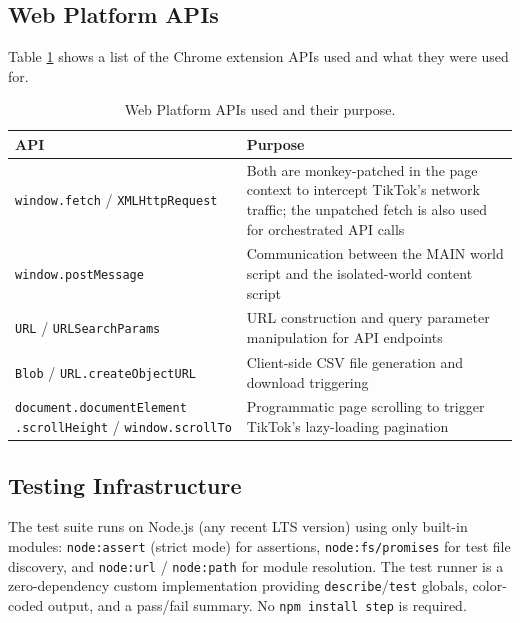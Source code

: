 \subsection{Web Platform APIs}

Table \ref{tab:web_platform_api_usage} shows a list of the Chrome extension APIs used and what they were used for.

\begin{table}[h]
    \centering
    \begin{tabular}{p{} p{}}
        \toprule
        \textbf{API} & \textbf{Purpose} \\
        \midrule
         \texttt{window.fetch} / \texttt{XMLHttpRequest} & Both are monkey-patched in the page context to intercept TikTok's network traffic; the unpatched fetch is also used for orchestrated API calls \\
         \texttt{window.postMessage} & Communication between the MAIN world script and the isolated-world content script \\
         \texttt{URL} / \texttt{URLSearchParams} & URL construction and query parameter manipulation for API endpoints \\
         \texttt{Blob} / \texttt{URL.createObjectURL} & Client-side CSV file generation and download triggering \\
         \texttt{document.documentElement} \texttt{.scrollHeight} / \texttt{window.scrollTo} & Programmatic page scrolling to trigger TikTok's lazy-loading pagination \\
        \bottomrule
    \end{tabular}
    \caption{Web Platform APIs used and their purpose.}
    \label{tab:web_platform_api_usage}
\end{table}

\subsection{Testing Infrastructure}

The test suite runs on Node.js (any recent LTS version) using only built-in modules: \texttt{node:assert} (strict mode) for assertions, \texttt{node:fs/promises} for test file discovery, and \texttt{node:url} / \texttt{node:path} for module resolution. The test runner is a zero-dependency custom implementation providing \texttt{describe}/\texttt{test} globals, color-coded output, and a pass/fail summary. No \texttt{npm install step} is required.

